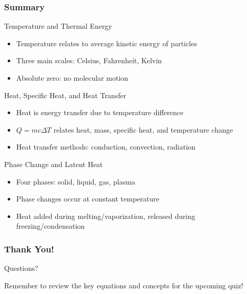 \documentclass{beamer}
\begin{document}
\begin{frame}
    \frametitle{Summary}
    \begin{block}{Temperature and Thermal Energy}
        \begin{itemize}
            \item Temperature relates to average kinetic energy of particles
            \item Three main scales: Celsius, Fahrenheit, Kelvin
            \item Absolute zero: no molecular motion
        \end{itemize}
    \end{block}
    
    \begin{block}{Heat, Specific Heat, and Heat Transfer}
        \begin{itemize}
            \item Heat is energy transfer due to temperature difference
            \item $Q = mc\Delta T$ relates heat, mass, specific heat, and temperature change
            \item Heat transfer methods: conduction, convection, radiation
        \end{itemize}
    \end{block}
    
    \begin{block}{Phase Change and Latent Heat}
        \begin{itemize}
            \item Four phases: solid, liquid, gas, plasma
            \item Phase changes occur at constant temperature
            \item Heat added during melting/vaporization, released during freezing/condensation
        \end{itemize}
    \end{block}
\end{frame}

\begin{frame}
    \frametitle{Thank You!}
    \begin{center}
        \Huge{Questions?}
        
        \vspace{1cm}
        \normalsize
        Remember to review the key equations and concepts for the upcoming quiz!
    \end{center}
\end{frame}
\end{document}
